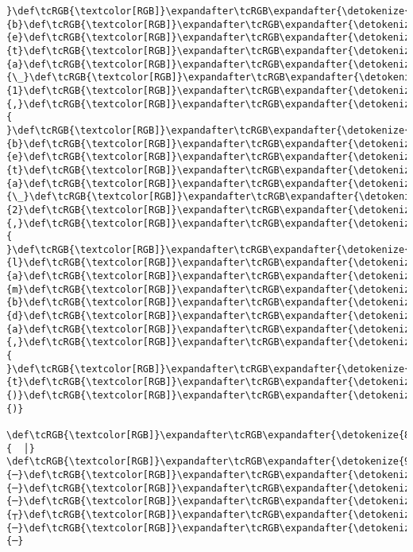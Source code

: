 \documentclass[11pt]{article}
\begin{document}
\begin{Verbatim}[commandchars=\\\{\}, frame=single, framerule=2mm, rulecolor=\color{outerrorbackground}]
}\def\tcRGB{\textcolor[RGB]}\expandafter\tcRGB\expandafter{\detokenize{178,178,178}}{b}\def\tcRGB{\textcolor[RGB]}\expandafter\tcRGB\expandafter{\detokenize{178,178,178}}{e}\def\tcRGB{\textcolor[RGB]}\expandafter\tcRGB\expandafter{\detokenize{178,178,178}}{t}\def\tcRGB{\textcolor[RGB]}\expandafter\tcRGB\expandafter{\detokenize{178,178,178}}{a}\def\tcRGB{\textcolor[RGB]}\expandafter\tcRGB\expandafter{\detokenize{178,178,178}}{\_}\def\tcRGB{\textcolor[RGB]}\expandafter\tcRGB\expandafter{\detokenize{178,178,178}}{1}\def\tcRGB{\textcolor[RGB]}\expandafter\tcRGB\expandafter{\detokenize{178,178,178}}{,}\def\tcRGB{\textcolor[RGB]}\expandafter\tcRGB\expandafter{\detokenize{178,178,178}}{ }\def\tcRGB{\textcolor[RGB]}\expandafter\tcRGB\expandafter{\detokenize{178,178,178}}{b}\def\tcRGB{\textcolor[RGB]}\expandafter\tcRGB\expandafter{\detokenize{178,178,178}}{e}\def\tcRGB{\textcolor[RGB]}\expandafter\tcRGB\expandafter{\detokenize{178,178,178}}{t}\def\tcRGB{\textcolor[RGB]}\expandafter\tcRGB\expandafter{\detokenize{178,178,178}}{a}\def\tcRGB{\textcolor[RGB]}\expandafter\tcRGB\expandafter{\detokenize{178,178,178}}{\_}\def\tcRGB{\textcolor[RGB]}\expandafter\tcRGB\expandafter{\detokenize{178,178,178}}{2}\def\tcRGB{\textcolor[RGB]}\expandafter\tcRGB\expandafter{\detokenize{178,178,178}}{,}\def\tcRGB{\textcolor[RGB]}\expandafter\tcRGB\expandafter{\detokenize{178,178,178}}{ }\def\tcRGB{\textcolor[RGB]}\expandafter\tcRGB\expandafter{\detokenize{178,178,178}}{l}\def\tcRGB{\textcolor[RGB]}\expandafter\tcRGB\expandafter{\detokenize{178,178,178}}{a}\def\tcRGB{\textcolor[RGB]}\expandafter\tcRGB\expandafter{\detokenize{178,178,178}}{m}\def\tcRGB{\textcolor[RGB]}\expandafter\tcRGB\expandafter{\detokenize{178,178,178}}{b}\def\tcRGB{\textcolor[RGB]}\expandafter\tcRGB\expandafter{\detokenize{178,178,178}}{d}\def\tcRGB{\textcolor[RGB]}\expandafter\tcRGB\expandafter{\detokenize{178,178,178}}{a}\def\tcRGB{\textcolor[RGB]}\expandafter\tcRGB\expandafter{\detokenize{178,178,178}}{,}\def\tcRGB{\textcolor[RGB]}\expandafter\tcRGB\expandafter{\detokenize{178,178,178}}{ }\def\tcRGB{\textcolor[RGB]}\expandafter\tcRGB\expandafter{\detokenize{178,178,178}}{t}\def\tcRGB{\textcolor[RGB]}\expandafter\tcRGB\expandafter{\detokenize{178,178,178}}{)}\def\tcRGB{\textcolor[RGB]}\expandafter\tcRGB\expandafter{\detokenize{178,178,178}}{)}
 \def\tcRGB{\textcolor[RGB]}\expandafter\tcRGB\expandafter{\detokenize{88,88,88}}{  │}                 \def\tcRGB{\textcolor[RGB]}\expandafter\tcRGB\expandafter{\detokenize{95,0,135}}{─}\def\tcRGB{\textcolor[RGB]}\expandafter\tcRGB\expandafter{\detokenize{95,0,135}}{─}\def\tcRGB{\textcolor[RGB]}\expandafter\tcRGB\expandafter{\detokenize{95,0,135}}{─}\def\tcRGB{\textcolor[RGB]}\expandafter\tcRGB\expandafter{\detokenize{95,0,135}}{┬}\def\tcRGB{\textcolor[RGB]}\expandafter\tcRGB\expandafter{\detokenize{95,0,135}}{─}\def\tcRGB{\textcolor[RGB]}\expandafter\tcRGB\expandafter{\detokenize{95,0,135}}{─}  

\end{Verbatim}
\end{document}
